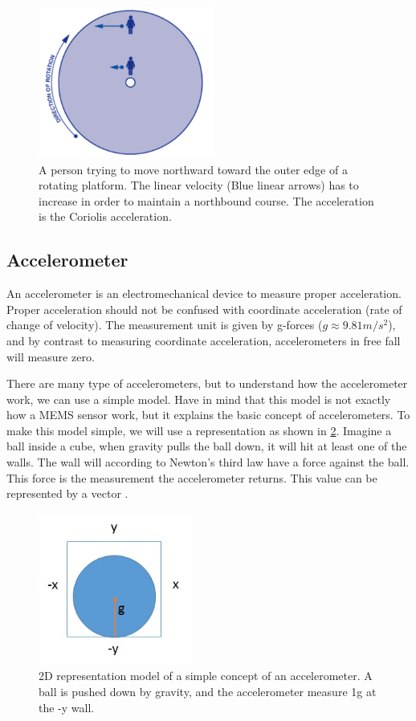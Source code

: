 \begin{figure}[ht]
    \centering
    \includegraphics[height=5cm]{images/coriolis_acceleration.jpg}
    \caption[Coriolis Acceleration Example]{A person trying to move northward toward the outer edge of a rotating platform. The linear velocity (Blue linear arrows) has to increase in order to maintain a northbound course. The acceleration is the Coriolis acceleration.}
    \label{fig:coriolis_acceleration}
\end{figure}


\subsection{Accelerometer}
An accelerometer is an electromechanical device to measure proper acceleration. Proper acceleration should not be confused with coordinate acceleration (rate of change of velocity). The measurement unit is given by g-forces ($g \approx 9.81m/s^{2}$), and by contrast to measuring coordinate acceleration, accelerometers in free fall will measure zero. 

There are many type of accelerometers, but to understand how the accelerometer work, we can use a simple model. Have in mind that this model is not exactly how a MEMS sensor work, but it explains the basic concept of accelerometers. To make this model simple, we will use a representation as shown in \cref{fig:accelerometer_model}. Imagine a ball inside a cube, when gravity pulls the ball down, it will hit at least one of the walls. The wall will according to Newton's third law have a force against the ball. This force is the measurement the accelerometer returns. This value can be represented by a vector \cite{IMU_guide}.

\begin{figure}[ht]
    \centering
    \includegraphics[height=5cm]{images/accelerometer.jpg}
    \caption[Accelerometer model]{2D representation model of a simple concept of an accelerometer. A ball is pushed down by gravity, and the accelerometer measure 1g at the -y wall.}
    \label{fig:accelerometer_model}
\end{figure}

